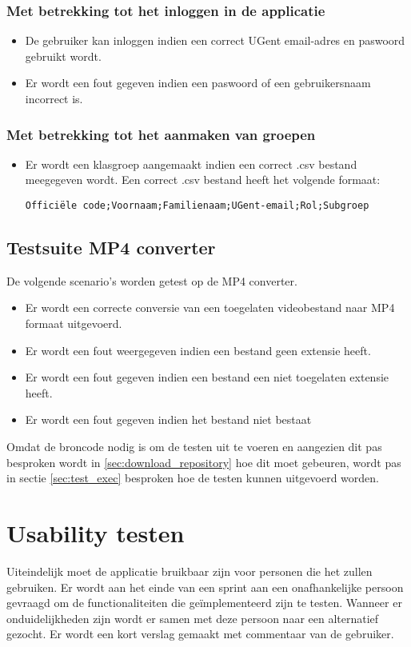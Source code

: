 \subsubsection{Met betrekking tot het inloggen in de applicatie}
\begin{itemize}
 \item De gebruiker kan inloggen indien een correct UGent email-adres en paswoord gebruikt wordt.
 \item Er wordt een fout gegeven indien een paswoord of een gebruikersnaam incorrect is.
\end{itemize}

\subsubsection{Met betrekking tot het aanmaken van groepen}
 \begin{itemize}
  \item Er wordt een klasgroep aangemaakt indien een correct .csv bestand meegegeven wordt. Een correct .csv bestand heeft het volgende formaat:
  
  \texttt{Offici\"ele code;Voornaam;Familienaam;UGent-email;Rol;Subgroep}
 \end{itemize}



\subsection{Testsuite MP4 converter}
De volgende scenario's worden getest op de MP4 converter.
\begin{itemize}
 \item Er wordt een correcte conversie van een toegelaten videobestand naar MP4 formaat uitgevoerd.
 \item Er wordt een fout weergegeven indien een bestand geen extensie heeft.
 \item Er wordt een fout gegeven indien een bestand een niet toegelaten extensie heeft.
 \item Er wordt een fout gegeven indien het bestand niet bestaat
\end{itemize}


Omdat de broncode nodig is om de testen uit te voeren en aangezien dit pas besproken wordt in \ref{sec:download_repository} hoe dit moet gebeuren, wordt pas in sectie \ref{sec:test_exec} besproken hoe de testen kunnen uitgevoerd worden.



\section{Usability testen}
Uiteindelijk moet de applicatie bruikbaar zijn voor personen die het zullen gebruiken. Er wordt aan het einde van een sprint aan een onafhankelijke persoon gevraagd om de functionaliteiten die ge\"implementeerd zijn te testen. Wanneer er onduidelijkheden zijn wordt er samen met deze persoon naar een alternatief gezocht. Er wordt een kort verslag gemaakt  met commentaar van de gebruiker.

